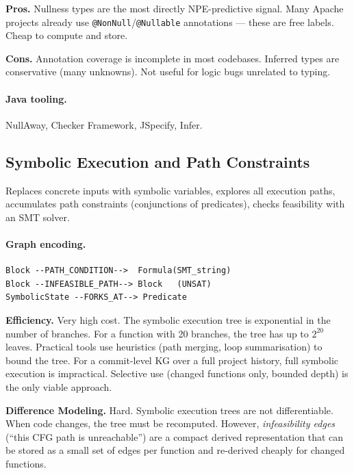 \documentclass[12pt,a4paper]{article}
\begin{document}
\begin{prosbox}
\textbf{Pros.}
Nullness types are the most directly NPE-predictive signal. Many Apache projects
already use \texttt{@NonNull}/\texttt{@Nullable} annotations --- these are free
labels. Cheap to compute and store.
\end{prosbox}

\begin{consbox}
\textbf{Cons.}
Annotation coverage is incomplete in most codebases. Inferred types are
conservative (many unknowns). Not useful for logic bugs unrelated to typing.
\end{consbox}

\paragraph{Java tooling.} NullAway, Checker Framework, JSpecify, Infer.

\subsection{Symbolic Execution and Path Constraints}

Replaces concrete inputs with symbolic variables, explores all execution paths,
accumulates path constraints (conjunctions of predicates), checks feasibility
with an SMT solver.

\paragraph{Graph encoding.}
\begin{lstlisting}
Block --PATH_CONDITION-->  Formula(SMT_string)
Block --INFEASIBLE_PATH--> Block   (UNSAT)
SymbolicState --FORKS_AT--> Predicate
\end{lstlisting}

\begin{effbox}
\textbf{Efficiency.}
Very high cost. The symbolic execution tree is exponential in the number of
branches. For a function with 20 branches, the tree has up to $2^{20}$ leaves.
Practical tools use heuristics (path merging, loop summarisation) to bound
the tree. For a commit-level KG over a full project history, full symbolic
execution is impractical. Selective use (changed functions only, bounded
depth) is the only viable approach.
\end{effbox}

\begin{diffbox}
\textbf{Difference Modeling.}
Hard. Symbolic execution trees are not differentiable. When code changes, the
tree must be recomputed. However, \emph{infeasibility edges}
(``this CFG path is unreachable'') are a compact derived representation that
can be stored as a small set of edges per function and re-derived cheaply for
changed functions.
\end{diffbox}
\end{document}
